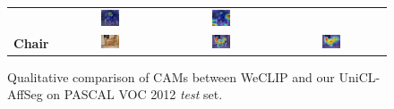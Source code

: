 \begin{figure}[ht]
\begin{tcolorbox}[colframe=black!60, colback=white, boxrule=0.8pt, arc=2pt, left=2pt, right=2pt, top=2pt, bottom=2pt]
\begin{tabular}{m{2.5cm} c c c}
    & \includegraphics[width=0.18\textwidth,height=0.18\textwidth]{figures/test_cams/weclip/2007_000783_14}
    & \includegraphics[width=0.18\textwidth,height=0.18\textwidth]{figures/test_cams/ours/2007_000783_14}
    \\
    \textbf{Chair}
    & \includegraphics[width=0.18\textwidth,height=0.18\textwidth]{figures/originals/2007_005844}
    & \includegraphics[width=0.18\textwidth,height=0.18\textwidth]{figures/test_cams/weclip/2007_005844_8}
    & \includegraphics[width=0.18\textwidth,height=0.18\textwidth]{figures/test_cams/ours/2007_005844_8}
    \\
  \end{tabular}

  \end{tcolorbox}

  \caption{Qualitative comparison of CAMs between WeCLIP and our UniCL-AffSeg on PASCAL VOC 2012 \textit{test} set.}
  \label{fig:qualitative_comparison_cam_test}
\end{figure}

